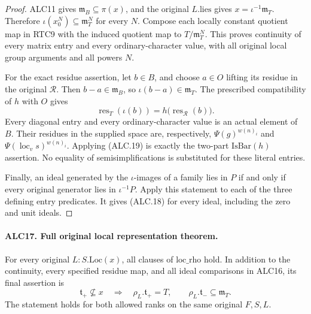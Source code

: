\documentclass[11pt,a4paper]{article}
\numberwithin{equation}{section}
\theoremstyle{remark}\newtheorem{remark}[theorem]{Remark}
\begin{document}
\begin{proof}
ALC11 gives \(\mathfrak m_B\subseteq\pi(x)\), and the
original \(L.\mathrm{lies}\) gives
\(x=\iota^{-1}\mathfrak m_T\).  Therefore
\(\iota(x_0^N)\subseteq\mathfrak m_T^N\) for every
\(N\).  Compose each locally constant quotient map in
RTC9 with the induced quotient map to
\(T/\mathfrak m_T^N\).  This proves continuity of every
matrix entry and every ordinary-character value, with all
original local group arguments and all powers \(N\).

For the exact residue assertion, let \(b\in B\), and
choose \(a\in O\) lifting its residue in the original
\(\mathcal R\).  Then \(b-a\in\mathfrak m_B\), so
\(\iota(b-a)\in\mathfrak m_T\).  The prescribed
compatibility of \(h\) with \(O\) gives
\[
 \operatorname{res}_T(\iota(b))
       =h\bigl(\operatorname{res}_{\mathcal R}(b)\bigr).
                                                        \tag{ALC.19}
\]
Every diagonal entry and every ordinary-character value is
an actual element of \(B\).  Their residues in the supplied
space are, respectively, \(\Psi(g)^{w(n)_i}\) and
\(\Psi(\operatorname{loc}_v s)^{w(n)_i}\).
Applying (ALC.19) is exactly the two-part
\(\mathrm{IsBar}(h)\) assertion.  No equality of
semisimplifications is substituted for these literal entries.

Finally, an ideal generated by the \(\iota\)-images of
a family lies in \(P\) if and only if every original
generator lies in \(\iota^{-1}P\).  Apply this statement
to each of the three defining entry predicates.  It gives
(ALC.18) for every ideal, including the zero and unit ideals.
\end{proof}

\paragraph{ALC17. Full original local representation theorem.}
\label{claim:ALC17}
For every original \(L:S.\mathrm{Loc}(x)\), all clauses
of \(\mathrm{loc\_\allowbreak rho}\) hold.  In addition to the
continuity, every specified residue map, and all ideal
comparisons in ALC16, its final assertion is
\[
 \mathfrak t_+\not\subseteq x
 \quad\Longrightarrow\quad
 \rho_L.\mathfrak t_+=T,
 \qquad \rho_L.\mathfrak t_-\subseteq\mathfrak m_T.
                                                        \tag{ALC.20}
\]
The statement holds for both allowed ranks on the same
original \(F,S,L\).
\end{document}
